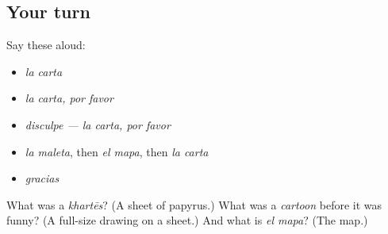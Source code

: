 \subsection*{Your turn}
Say these aloud:

\begin{itemize}
\raggedright
  \item \emph{la carta}
  \item \emph{la carta, por favor}
  \item \emph{disculpe — la carta, por favor}
  \item \emph{la maleta}, then \emph{el mapa}, then \emph{la carta}
  \item \emph{gracias}
\end{itemize}

\begin{tcolorbox}[breakable,colback=teal!4,colframe=teal!35!black,title={Before you move on}]
What was a \emph{khartēs}? (A sheet of papyrus.) What was a \emph{cartoon} before it was funny? (A full-size drawing on a sheet.) And what is \emph{el mapa}? (The map.)
\end{tcolorbox}
